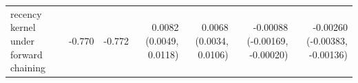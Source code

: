 \begin{tabular}{lrrrrrr}
recency kernel under forward chaining & -0.770 & -0.772 & 0.0082 (0.0049, 0.0118) & 0.0068 (0.0034, 0.0106) & -0.00088 (-0.00169, -0.00020) & -0.00260 (-0.00383, -0.00136) \\

\end{tabular}
